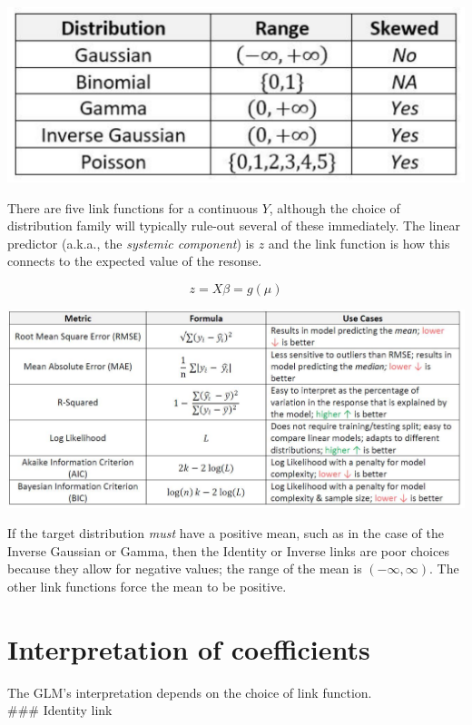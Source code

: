 \documentclass[openany]{book}
\begin{document}
\begin{center}\includegraphics[width=8\linewidth]{images/response_distributions} \end{center}

There are five link functions for a continuous \(Y\), although the choice of distribution family will typically rule-out several of these immediately. The linear predictor (a.k.a., the \emph{systemic component}) is \(z\) and the link function is how this connects to the expected value of the resonse.

\[z = X\beta = g(\mu)\]

\begin{center}\includegraphics[width=8\linewidth]{images/link_functions} \end{center}

If the target distribution \emph{must} have a positive mean, such as in the case of the Inverse Gaussian or Gamma, then the Identity or Inverse links are poor choices because they allow for negative values; the range of the mean is \((-\infty, \infty)\). The other link functions force the mean to be positive.

\hypertarget{interpretation-of-coefficients}{%
\section{Interpretation of coefficients}\label{interpretation-of-coefficients}}

The GLM's interpretation depends on the choice of link function.\\
\#\#\# Identity link
\end{document}

